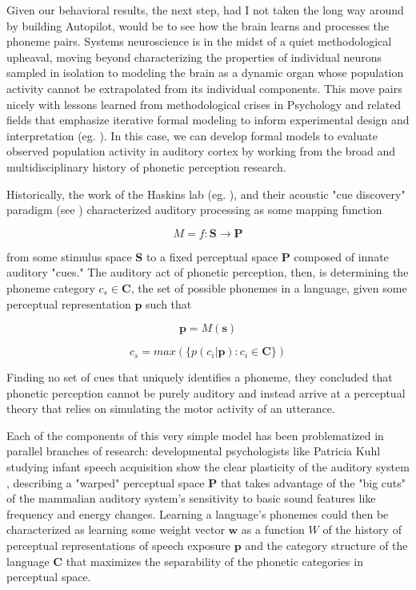 Given our behavioral results, the next step, had I not taken the long way around by building Autopilot, would be to see how the brain learns and processes the phoneme pairs. Systems neuroscience is in the midst of a quiet methodological upheaval, moving beyond characterizing the properties of individual neurons sampled in isolation to modeling the brain as a dynamic organ whose population activity cannot be extrapolated from its individual components. This move pairs nicely with lessons learned from methodological crises in Psychology and related fields that emphasize iterative formal modeling to inform experimental design and interpretation (eg. \cite{vanrooijTheoryTestHow2021}). In this case, we can develop formal models to evaluate observed population activity in auditory cortex by working from the broad and multidisciplinary history of phonetic perception research.

Historically, the work of the Haskins lab (eg. \cite{schertzPhoneticCueWeighting2020}), and their acoustic "cue discovery" paradigm (see \cite[p.~51]{ohalaGuideHistoryPhonetic1999}) characterized auditory processing as some mapping function 

\begin{equation}
\label{eqn:map}
M = f: \mathbf{S} \to \mathbf{P}
\end{equation} 

from some stimulus space $\mathbf{S}$ to a fixed\cite{Liberman1985a} perceptual space $\mathbf{P}$ composed of innate auditory "cues." The auditory act of phonetic perception, then, is determining the phoneme category $c_s \in \mathbf{C}$, the set of possible phonemes in a language, given some perceptual representation $\mathbf{p}$ such that

\begin{equation}
\label{eqn:pfroms}
\mathbf{p} = M(\mathbf{s})
\end{equation}

\begin{equation}
\label{eqn:infer}
c_s = max( \{ p(c_i | \mathbf{p}) : c_i \in \mathbf{C} \})
\end{equation}

Finding no set of cues that uniquely identifies a phoneme, they concluded that phonetic perception cannot be purely auditory and instead arrive at a perceptual theory that relies on simulating the motor activity of an utterance\cite{Liberman1985a}.

Each of the components of this very simple model has been problematized in parallel branches of research: developmental psychologists like Patricia Kuhl studying infant speech acquisition show the clear plasticity of the auditory system \cite{kuhlEarlyLanguageAcquisition2004}, describing a "warped" perceptual space $\mathbf{P}$ that takes advantage of the "big cuts" of the mammalian auditory system's sensitivity to basic sound features like frequency and energy changes. Learning a language's phonemes could then be characterized as learning some weight vector $\mathbf{w}$ as a function $W$ of the history of perceptual representations of speech exposure $\mathbf{p}$ and the category structure of the language $\mathbf{C}$ that maximizes the separability of the phonetic categories in perceptual space. 

